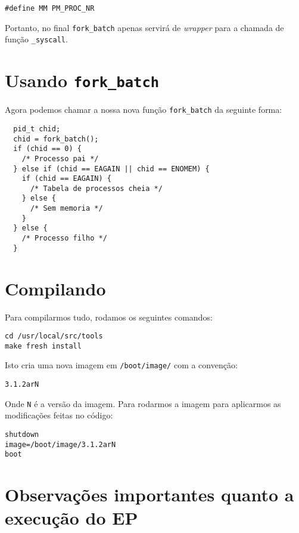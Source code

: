 \documentclass{amsart}
\theoremstyle{plain}
\newcommand{\code}[1]{\lstinline[mathescape=true]{#1}}
\begin{document}
\begin{lstlisting}[frame=leftline,mathescape=true,style=nonumbers]
#define MM PM_PROC_NR
\end{lstlisting}

Portanto, no final \code{fork_batch} apenas servirá de \textit{wrapper} para a chamada de função
\code{_syscall}.

\section{Usando \code{fork_batch}}

Agora podemos chamar a nossa nova função \code{fork_batch} da seguinte forma:

\begin{verbatim}
  pid_t chid;
  chid = fork_batch();
  if (chid == 0) {
    /* Processo pai */
  } else if (chid == EAGAIN || chid == ENOMEM) {
    if (chid == EAGAIN) {
      /* Tabela de processos cheia */
    } else {
      /* Sem memoria */
    }
  } else {
    /* Processo filho */
  }
\end{verbatim}

\section{Compilando}

Para compilarmos tudo, rodamos os seguintes comandos:

\begin{lstlisting}[frame=leftline,mathescape=true,style=nonumbers]
cd /usr/local/src/tools
make fresh install
\end{lstlisting}

Isto cria uma nova imagem em \code{/boot/image/} com a convenção:

\begin{lstlisting}[frame=leftline,mathescape=true,style=nonumbers]
3.1.2arN
\end{lstlisting}

Onde \code{N} é a versão da imagem. Para rodarmos a imagem para aplicarmos as modificações feitas
no código:

\begin{lstlisting}[frame=leftline,mathescape=true,style=nonumbers]
shutdown
image=/boot/image/3.1.2arN
boot
\end{lstlisting}

\section{Observações importantes quanto a execução do EP}
\end{document}
